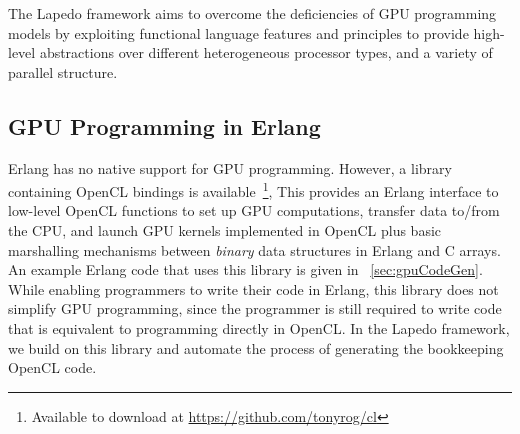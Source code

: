 \documentclass[final]{jfp1}
\newcommand{\lapedo}{\xspace{\sc Lapedo}\xspace}
\newcommand{\Lapedo}{\lapedo}
\begin{document}
The \Lapedo{} framework aims to overcome the deficiencies of
GPU programming models by
exploiting functional language features and principles to provide high-level
abstractions over different heterogeneous processor types, and a variety
of parallel structure.

\subsection{GPU Programming in Erlang}
\label{gpuerlang}

Erlang has no native support for GPU programming. However,
a library containing OpenCL bindings is available~\cite{erlangopencl}\footnote{Available to download at
  \url{https://github.com/tonyrog/cl}}, 
This provides an Erlang interface
to low-level OpenCL functions to set up GPU computations, transfer data
to/from the CPU, and launch GPU kernels
implemented in OpenCL plus basic marshalling
mechanisms between \emph{binary} data structures in Erlang and C arrays.
An example Erlang code that uses this library is given in ~\ref{sec:gpuCodeGen}. 
While enabling programmers to write their
code in Erlang, this library does not simplify GPU programming,
since the programmer is still required to write code that is equivalent 
to programming directly in OpenCL. In the \Lapedo{} framework, we build
on this library and automate the process of generating the bookkeeping
OpenCL code. 
\end{document}
